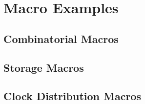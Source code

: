 \part{Macro Examples}
\pagestyle{headings}


\chapter{Combinatorial Macros}
\clearpage




\chapter{Storage Macros}
\clearpage




\chapter{Clock Distribution Macros}
\clearpage



